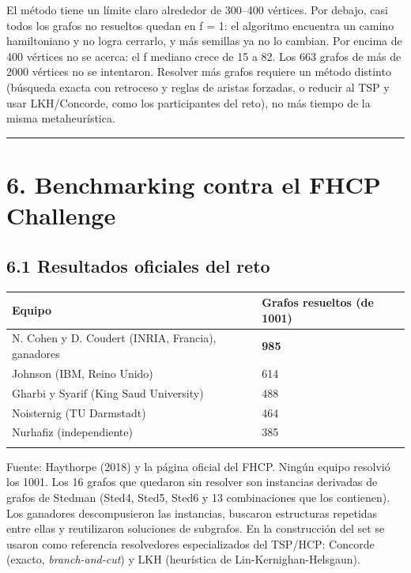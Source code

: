 \documentclass[
  spanish,
  11pt,
]{article}
\newcounter{none} %
\begin{document}
El método tiene un límite claro alrededor de 300--400 vértices. Por
debajo, casi todos los grafos no resueltos quedan en f = 1: el algoritmo
encuentra un camino hamiltoniano y no logra cerrarlo, y más semillas ya
no lo cambian. Por encima de 400 vértices no se acerca: el f mediano
crece de 15 a 82. Los 663 grafos de más de 2000 vértices no se
intentaron. Resolver más grafos requiere un método distinto (búsqueda
exacta con retroceso y reglas de aristas forzadas, o reducir al TSP y
usar LKH/Concorde, como los participantes del reto), no más tiempo de la
misma metaheurística.

\begin{center}\rule{0.5\linewidth}{0.5pt}\end{center}

\section{6. Benchmarking contra el FHCP
Challenge}\label{benchmarking-contra-el-fhcp-challenge}

\subsection{6.1 Resultados oficiales del
reto}\label{resultados-oficiales-del-reto}

{\def\LTcaptype{none} %
\begin{center}
\begin{tabular}{@{}ll@{}}
\toprule\noalign{}
Equipo & Grafos resueltos (de 1001) \\
\midrule\noalign{}
N. Cohen y D. Coudert (INRIA, Francia), ganadores & \textbf{985} \\
Johnson (IBM, Reino Unido) & 614 \\
Gharbi y Syarif (King Saud University) & 488 \\
Noisternig (TU Darmstadt) & 464 \\
Nurhafiz (independiente) & 385 \\
\bottomrule\noalign{}
\end{tabular}
\end{center}
}

Fuente: Haythorpe (2018) y la página oficial del FHCP. Ningún equipo
resolvió los 1001. Los 16 grafos que quedaron sin resolver son
instancias derivadas de grafos de Stedman (Sted4, Sted5, Sted6 y 13
combinaciones que los contienen). Los ganadores descompusieron las
instancias, buscaron estructuras repetidas entre ellas y reutilizaron
soluciones de subgrafos. En la construcción del set se usaron como
referencia resolvedores especializados del TSP/HCP: Concorde (exacto,
\emph{branch-and-cut}) y LKH (heurística de Lin-Kernighan-Helsgaun).
\end{document}

